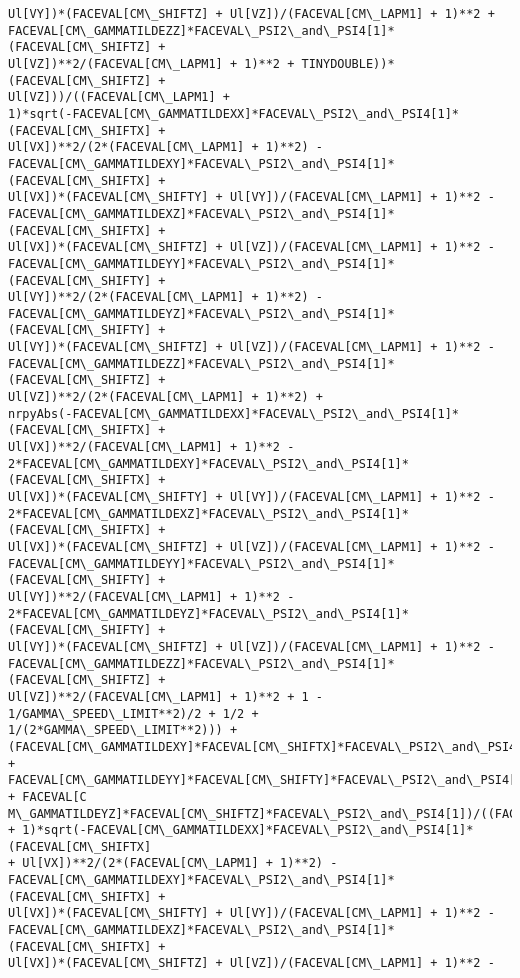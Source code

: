 \documentclass[landscape,letterpaper,10pt,english]{article}
\begin{document}
\begin{Verbatim}[commandchars=\\\{\}]
Ul[VY])*(FACEVAL[CM\_SHIFTZ] + Ul[VZ])/(FACEVAL[CM\_LAPM1] + 1)**2 +
FACEVAL[CM\_GAMMATILDEZZ]*FACEVAL\_PSI2\_and\_PSI4[1]*(FACEVAL[CM\_SHIFTZ] +
Ul[VZ])**2/(FACEVAL[CM\_LAPM1] + 1)**2 + TINYDOUBLE))*(FACEVAL[CM\_SHIFTZ] +
Ul[VZ]))/((FACEVAL[CM\_LAPM1] +
1)*sqrt(-FACEVAL[CM\_GAMMATILDEXX]*FACEVAL\_PSI2\_and\_PSI4[1]*(FACEVAL[CM\_SHIFTX] +
Ul[VX])**2/(2*(FACEVAL[CM\_LAPM1] + 1)**2) -
FACEVAL[CM\_GAMMATILDEXY]*FACEVAL\_PSI2\_and\_PSI4[1]*(FACEVAL[CM\_SHIFTX] +
Ul[VX])*(FACEVAL[CM\_SHIFTY] + Ul[VY])/(FACEVAL[CM\_LAPM1] + 1)**2 -
FACEVAL[CM\_GAMMATILDEXZ]*FACEVAL\_PSI2\_and\_PSI4[1]*(FACEVAL[CM\_SHIFTX] +
Ul[VX])*(FACEVAL[CM\_SHIFTZ] + Ul[VZ])/(FACEVAL[CM\_LAPM1] + 1)**2 -
FACEVAL[CM\_GAMMATILDEYY]*FACEVAL\_PSI2\_and\_PSI4[1]*(FACEVAL[CM\_SHIFTY] +
Ul[VY])**2/(2*(FACEVAL[CM\_LAPM1] + 1)**2) -
FACEVAL[CM\_GAMMATILDEYZ]*FACEVAL\_PSI2\_and\_PSI4[1]*(FACEVAL[CM\_SHIFTY] +
Ul[VY])*(FACEVAL[CM\_SHIFTZ] + Ul[VZ])/(FACEVAL[CM\_LAPM1] + 1)**2 -
FACEVAL[CM\_GAMMATILDEZZ]*FACEVAL\_PSI2\_and\_PSI4[1]*(FACEVAL[CM\_SHIFTZ] +
Ul[VZ])**2/(2*(FACEVAL[CM\_LAPM1] + 1)**2) +
nrpyAbs(-FACEVAL[CM\_GAMMATILDEXX]*FACEVAL\_PSI2\_and\_PSI4[1]*(FACEVAL[CM\_SHIFTX] +
Ul[VX])**2/(FACEVAL[CM\_LAPM1] + 1)**2 -
2*FACEVAL[CM\_GAMMATILDEXY]*FACEVAL\_PSI2\_and\_PSI4[1]*(FACEVAL[CM\_SHIFTX] +
Ul[VX])*(FACEVAL[CM\_SHIFTY] + Ul[VY])/(FACEVAL[CM\_LAPM1] + 1)**2 -
2*FACEVAL[CM\_GAMMATILDEXZ]*FACEVAL\_PSI2\_and\_PSI4[1]*(FACEVAL[CM\_SHIFTX] +
Ul[VX])*(FACEVAL[CM\_SHIFTZ] + Ul[VZ])/(FACEVAL[CM\_LAPM1] + 1)**2 -
FACEVAL[CM\_GAMMATILDEYY]*FACEVAL\_PSI2\_and\_PSI4[1]*(FACEVAL[CM\_SHIFTY] +
Ul[VY])**2/(FACEVAL[CM\_LAPM1] + 1)**2 -
2*FACEVAL[CM\_GAMMATILDEYZ]*FACEVAL\_PSI2\_and\_PSI4[1]*(FACEVAL[CM\_SHIFTY] +
Ul[VY])*(FACEVAL[CM\_SHIFTZ] + Ul[VZ])/(FACEVAL[CM\_LAPM1] + 1)**2 -
FACEVAL[CM\_GAMMATILDEZZ]*FACEVAL\_PSI2\_and\_PSI4[1]*(FACEVAL[CM\_SHIFTZ] +
Ul[VZ])**2/(FACEVAL[CM\_LAPM1] + 1)**2 + 1 - 1/GAMMA\_SPEED\_LIMIT**2)/2 + 1/2 +
1/(2*GAMMA\_SPEED\_LIMIT**2))) +
(FACEVAL[CM\_GAMMATILDEXY]*FACEVAL[CM\_SHIFTX]*FACEVAL\_PSI2\_and\_PSI4[1] +
FACEVAL[CM\_GAMMATILDEYY]*FACEVAL[CM\_SHIFTY]*FACEVAL\_PSI2\_and\_PSI4[1] + FACEVAL[C
M\_GAMMATILDEYZ]*FACEVAL[CM\_SHIFTZ]*FACEVAL\_PSI2\_and\_PSI4[1])/((FACEVAL[CM\_LAPM1]
+ 1)*sqrt(-FACEVAL[CM\_GAMMATILDEXX]*FACEVAL\_PSI2\_and\_PSI4[1]*(FACEVAL[CM\_SHIFTX]
+ Ul[VX])**2/(2*(FACEVAL[CM\_LAPM1] + 1)**2) -
FACEVAL[CM\_GAMMATILDEXY]*FACEVAL\_PSI2\_and\_PSI4[1]*(FACEVAL[CM\_SHIFTX] +
Ul[VX])*(FACEVAL[CM\_SHIFTY] + Ul[VY])/(FACEVAL[CM\_LAPM1] + 1)**2 -
FACEVAL[CM\_GAMMATILDEXZ]*FACEVAL\_PSI2\_and\_PSI4[1]*(FACEVAL[CM\_SHIFTX] +
Ul[VX])*(FACEVAL[CM\_SHIFTZ] + Ul[VZ])/(FACEVAL[CM\_LAPM1] + 1)**2 -

\end{Verbatim}
\end{document}
